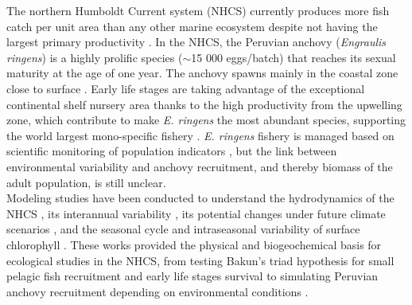The northern Humboldt Current system (NHCS) currently produces more fish catch per unit area than any other marine ecosystem \citep{BakuWeek2008,ChavBert2008} despite not having the largest primary productivity \citep{ChavMess2009,ChecAsch2017}. In the NHCS, the Peruvian anchovy (\textit{Engraulis ringens}) is a highly prolific species ($\sim$15 000 eggs/batch) that reaches its sexual maturity at the age of one year. The anchovy spawns mainly in the coastal zone close to surface \citep{GutiSwar2007,GutiRami2008}. Early life stages are taking advantage of the exceptional continental shelf nursery area thanks to the high productivity from the upwelling zone, which contribute to make \textit{E. ringens} the most abundant species, supporting the world largest mono-specific fishery \citep{FreoMull2003,AlheNiqu2004,GutiAkes2016,ChecAsch2017,FAO2020}. \textit{E. ringens} fishery is managed based on scientific monitoring of population indicators \citep{Ayon2000,GutiSwar2007}, but the link between environmental variability and anchovy recruitment, and thereby biomass of the adult population, is still unclear.\\

Modeling studies have been conducted to understand the hydrodynamics of the NHCS \citep{PenvEche2005,ColaMcwi2012}, its interannual variability \citep{ColaCape2008,EspiEche2017}, its potential changes under future climate scenarios \citep{OerdCola2015,EcheGeva2020}, and the seasonal cycle and intraseasonal variability of surface chlorophyll \citep{EcheAumo2008,EcheAlbe2014}. These works provided the physical and biogeochemical basis for ecological studies in the NHCS, from testing Bakun's triad hypothesis \citep{Baku1998} for small pelagic fish recruitment and early life stages survival \citep{LettPenv2007} to simulating Peruvian anchovy recruitment depending on environmental conditions \citep{BrocLett2008,BrocCola2009,BrocLett2011,BrocEche2013,XuChai2013,XuRose2015}.\\


